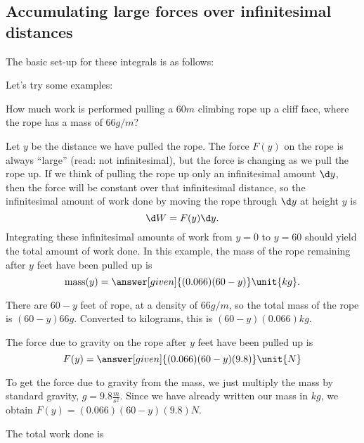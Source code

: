 \documentclass{ximera}
\begin{document}
\subsection{Accumulating large forces over infinitesimal distances}


The basic set-up for these integrals is as follows:
  \begin{image}[2in]
\end{image}
Let's try some examples:
\begin{example}
  How much work is performed pulling a $60\unit{m}$ climbing rope up a
  cliff face, where the rope has a mass of $66\unit{g}/\unit{m}$?
  \begin{explanation}
    Let $y$ be the distance we have pulled the rope.  The force $F(y)$
    on the rope is always ``large'' (read: not infinitesimal), but the
    force is changing as we pull the rope up.  If we think of pulling
    the rope up only an infinitesimal amount $\d y$, then the force
    will be constant over that infinitesimal distance, so the
    infinitesimal amount of work done by moving the rope through $\d
    y$ at height $y$ is
    \[
    \d W = F(y) \d y.
    \]
    Integrating these infinitesimal amounts of work from $y=0$ to
    $y=60$ should yield the total amount of work done.  In this
    example, the mass of the rope remaining after $y$ feet have been
    pulled up is
    \[
    \mathrm{mass}(y) = \answer[given]{(0.066)(60-y)} \unit{kg}.
    \]
    \begin{hint}
      There are $60-y$ feet of rope, at a density of $66\unit{g}/\unit{m}$, so
      the total mass of the rope is $(60-y)66\unit{g}$.  Converted to kilograms,
      this is $(60-y)(0.066)\unit{kg}$.
    \end{hint}
    The force due to gravity on the rope after $y$ feet have been pulled up is
    \[
    F(y) = \answer[given]{(0.066)(60-y)(9.8)} \unit{N} 
    \]
    \begin{hint}
      To get the force due to gravity from the mass, we just
      multiply the mass by standard gravity, $g = 9.8
      \frac{\unit{m}}{\unit{s}^2}$.  Since we have already written
      our mass in $\unit{kg}$, we obtain $F(y) = (0.066)(60-y)(9.8)
      \unit{N}$.
    \end{hint}
    The total work done is

\end{explanation}
\end{example}
\end{document}
